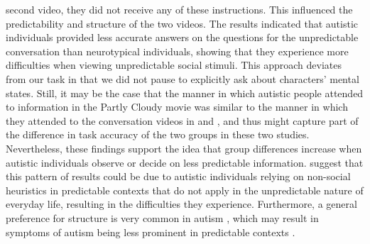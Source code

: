 second video, they did not receive any of these instructions. This influenced the predictability and structure of the two videos. The results indicated that autistic individuals provided less accurate answers on the questions for the unpredictable conversation than neurotypical individuals, showing that they experience more difficulties when viewing unpredictable social stimuli. This approach deviates from our task in that we did not pause to explicitly ask about characters' mental states. Still, it may be the case that the manner in which autistic people attended to information in the Partly Cloudy movie was similar to the manner in which they attended to the conversation videos in \cite{roeyers2001} and \cite{ponnet2008}, and thus might capture part of the difference in task accuracy of the two groups in these two studies. Nevertheless, these findings support the idea that group differences increase when autistic individuals observe or decide on less predictable information. \cite{frith1994} suggest that this pattern of results could be due to autistic individuals relying on non-social heuristics in predictable contexts that do not apply in the unpredictable nature of everyday life, resulting in the difficulties they experience. Furthermore, a general preference for structure is very common in autism \citep{apa2013}, which may result in symptoms of autism being less prominent in predictable contexts \citep{howlin2004,mesibov1992}. 

